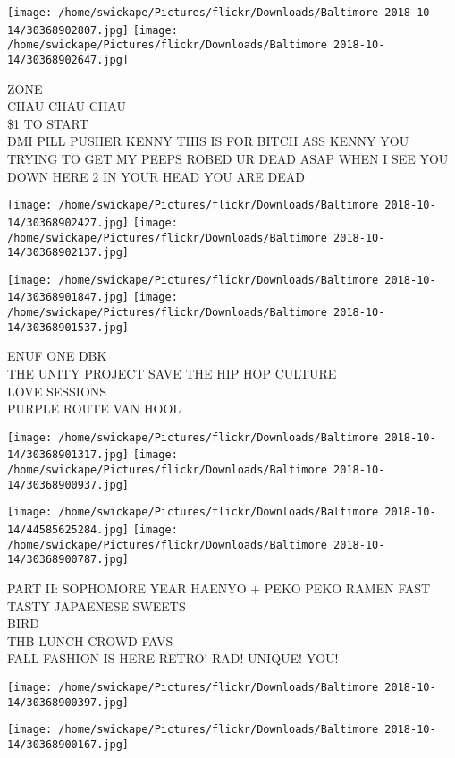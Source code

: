 \documentclass[10pt,letterpaper]{article}
\begin{document}
\texttt{[image: /home/swickape/Pictures/flickr/Downloads/Baltimore 2018-10-14/30368902807.jpg]}
\texttt{[image: /home/swickape/Pictures/flickr/Downloads/Baltimore 2018-10-14/30368902647.jpg]}

ZONE\\
CHAU CHAU CHAU\\
\$1 TO START\\
DMI PILL PUSHER KENNY THIS IS FOR BITCH ASS KENNY YOU TRYING TO GET MY PEEPS ROBED UR DEAD ASAP WHEN I SEE YOU DOWN HERE 2 IN YOUR HEAD YOU ARE DEAD\\
\pagebreak

\texttt{[image: /home/swickape/Pictures/flickr/Downloads/Baltimore 2018-10-14/30368902427.jpg]}
\texttt{[image: /home/swickape/Pictures/flickr/Downloads/Baltimore 2018-10-14/30368902137.jpg]}

\texttt{[image: /home/swickape/Pictures/flickr/Downloads/Baltimore 2018-10-14/30368901847.jpg]}
\texttt{[image: /home/swickape/Pictures/flickr/Downloads/Baltimore 2018-10-14/30368901537.jpg]}

ENUF ONE DBK\\
THE UNITY PROJECT SAVE THE HIP HOP CULTURE\\
LOVE SESSIONS\\
PURPLE ROUTE VAN HOOL\\
\pagebreak

\texttt{[image: /home/swickape/Pictures/flickr/Downloads/Baltimore 2018-10-14/30368901317.jpg]}
\texttt{[image: /home/swickape/Pictures/flickr/Downloads/Baltimore 2018-10-14/30368900937.jpg]}

\texttt{[image: /home/swickape/Pictures/flickr/Downloads/Baltimore 2018-10-14/44585625284.jpg]}
\texttt{[image: /home/swickape/Pictures/flickr/Downloads/Baltimore 2018-10-14/30368900787.jpg]}

PART II: SOPHOMORE YEAR HAENYO + PEKO PEKO RAMEN FAST TASTY JAPAENESE SWEETS\\
BIRD\\
THB LUNCH CROWD FAVS\\
FALL FASHION IS HERE RETRO! RAD! UNIQUE! YOU!\\
\pagebreak

\texttt{[image: /home/swickape/Pictures/flickr/Downloads/Baltimore 2018-10-14/30368900397.jpg]}

\vspace{0.25in}
\texttt{[image: /home/swickape/Pictures/flickr/Downloads/Baltimore 2018-10-14/30368900167.jpg]}
\end{document}
